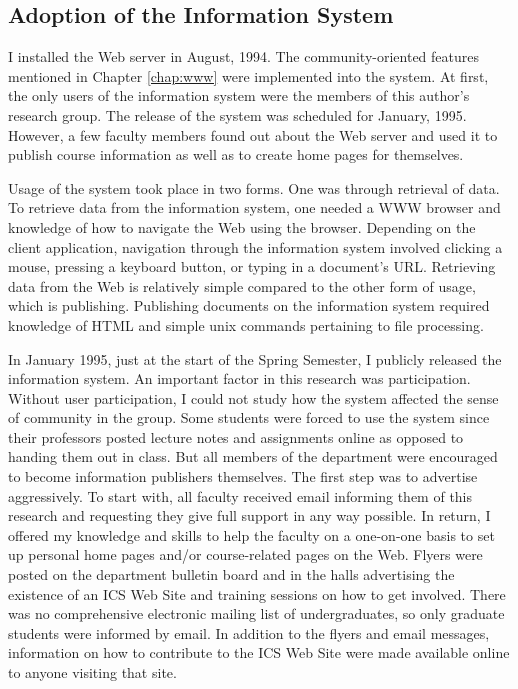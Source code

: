 \subsection{Adoption of the Information System}
I installed the Web server in August, 1994.  The community-oriented features
mentioned in Chapter \ref{chap:www} were implemented into the system.  At
first, the only users of the information system were the members of this
author's research group.  The release of the system was scheduled for January,
1995.  However, a few faculty members found out about the Web server and used
it to publish course information as well as to create home pages for
themselves.

Usage of the system took place in two forms.  One was through retrieval of
data.  To retrieve data from the information system, one needed a WWW browser
and knowledge of how to navigate the Web using the browser.  Depending on the
client application, navigation through the information system involved clicking
a mouse, pressing a keyboard button, or typing in a document's URL.  Retrieving
data from the Web is relatively simple compared to the other form of usage,
which is publishing.  Publishing documents on the information system required
knowledge of HTML and simple unix commands pertaining to file processing.

In January 1995, just at the start of the Spring Semester, I publicly released
the information system.  An important factor in this research was
participation.  Without user participation, I could not study how the system
affected the sense of community in the group.  Some students were forced to use
the system since their professors posted lecture notes and assignments online
as opposed to handing them out in class.  But all members of the department
were encouraged to become information publishers themselves.  The first step
was to advertise aggressively.  To start with, all faculty received email
informing them of this research and requesting they give full support in any
way possible.  In return, I offered my knowledge and skills to help the faculty
on a one-on-one basis to set up personal home pages and/or course-related pages
on the Web.  Flyers were posted on the department bulletin board and in the
halls advertising the existence of an ICS Web Site and training sessions on how
to get involved.  There was no comprehensive electronic mailing list of
undergraduates, so only graduate students were informed by email.  In addition
to the flyers and email messages, information on how to contribute to the ICS
Web Site were made available online to anyone visiting that site.

